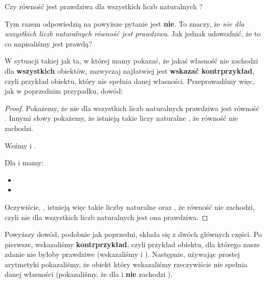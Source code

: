 \begin{example}
\label{example:counterexample}
Czy równość  jest prawdziwa dla wszystkich liczb naturalnych ?

Tym razem odpowiedzią na powyższe pytanie jest \textbf{nie}. To znaczy, że \textit{nie dla wszystkich liczb naturalnych  równość  jest prawdziwa}. Jak jednak udowodnić, że to co napisaliśmy jest prawdą?

W sytuacji takiej jak ta, w której mamy pokazać, że jakaś własność nie zachodzi dla \textbf{wszystkich} obiektów, zazwyczaj najłatwiej jest \textbf{wskazać kontrprzykład}, czyli przykład obiektu, który nie spełnia danej własności. Przeprowadźmy więc, jak w poprzednim przypadku, dowód:

\begin{proof}
Pokażemy, że nie dla wszystkich liczb naturalnych  prawdziwa jest równość . Innymi słowy pokażemy, że istnieją takie liczy naturalne , że równość  nie zachodzi.

Weźmy  i .

Dla  i  mamy:

\begin{itemize}
    \item {}
    \item {}
\end{itemize}
Oczywiście, , istnieją więc takie liczby naturalne  oraz , że równość  nie zachodzi, czyli nie dla wszystkich liczb naturalnych jest ona prawdziwa.
\end{proof}

Powyższy dowód, podobnie jak poprzedni, składa się z dwóch głównych części. Po pierwsze, wskazaliśmy \textbf{kontrprzykład}, czyli przykład obiektu, dla którego nasze zdanie nie byłoby prawdziwe (wskazaliśmy  i ). Następnie, używając prostej arytmetyki pokazaliśmy, że obiekt który wskazaliśmy rzeczywiście nie spełnia danej własności (pokazaliśmy, że dla  i  \textbf{nie} zachodzi ).
\end{example}

